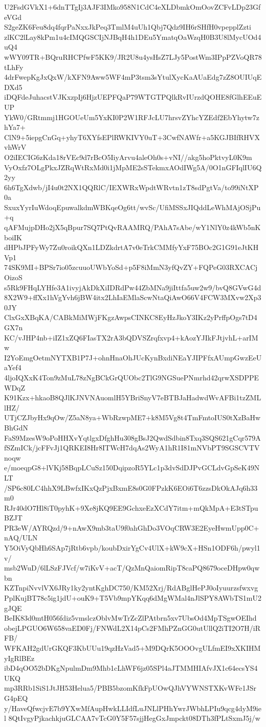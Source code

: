 U2FsdGVkX1+6dnTTgIj3AJF3IMko958N1CdC4eXLDbmkOmOovZCFvLDp23GfeVGd
S2geZK6Feu8dq4fqrPaNxxJkPeq3TmlM4uUh1Qbj7Qdz9IH6rSHfH0vpepplZzti
zlKC2lLay8kPm1u4cIMQGSCIjNJBqH4h1DEu5YmatqOaWzqH0B3U8lMycUOd4uQ4
wWY09TR+BQruRHCPfwF5KK9/JR2U8u4ysHsZ7LJy5PostWm3IPpPZVoQR78tLhFy
4drFwepKgJxQxW/kXFN9Aww5WF4mP3tsm3sYtulXycKaAUaEdg7zZ8OUIUqEDXd5
iDQFdeJuhacstVJKxzpIj6HjzUEPFQaP79WTGTPQlkRvIUrzdQOHE8fGlhEEuEUP
YkW0/GRtmmj1HGOUeUm5YxKI0P2W1RFJcLU7hrsvZYhcYZEdf2EbYhytw7zhYa7+
ClN9+5iepgCnGq+yhyT6XYfsEPlRWKIVY0uT+3CwfNAWfr+a5KGJBIfRHVXvhWrV
O2iIECIG6zKda18rVEc9d7rBcO5IiyArvu4aleOh0s+vNI//akg5hoPktvyL0K9m
VyOxfz7OLgPkxJZRqWtRxMd0i1jMpME2sSTekmxAOdIWg5A/0O1nGFIqlIU6Q2yy
6h6TgXdwb/jI4u0t2NX1QQRlC/IEXWRxWpdtWRvtn1zT8sdPgtVa/to99iNtXP0a
SxuxYyrIuWdoqEpuwalkdmWBKqeOg6tt/wvSc/UfiMSSxJIQddLeWhMAjOSjPu+q
qAFMujpDHo2jX5qBpur7SQ7PtQvRAAMRQ/PAhA7sAbe/wY1NlY0z4kWb5nKboiIK
dHPbJPFyWy7Zu0roikQXn1LDZkdrtA7v0eTrkCMMfyYxF75BOc2G1G91eJtKHVp1
74SK9MI+BPSr7io05zcuuoUWbYoSd+p5F8iMmN3yfQvZY+FQPeG03RXCACjOizoS
s5Rk9FHqLYHfe3A1ivyjAkDkXiIDRdPw44ZbMNa9jiIttfa5uw2w9/bvQ8GVwG4d
8X2W9+ffXx1hVgYvh6jBW4itx2LhIaEMlaScwNtaQiAwO66V4FCW3MXvw2Xp30JY
ClxGxXBqKA/CABkMiMWjFKgzAwpsCINKC8EyHzJkoY3IKz2yPrffpOgs7tD4GX7n
KC/vJHP4nb+iIZ1xZQ6FIasTX2rA3bQDVSZrqfxvp4+kAozYJIkFJtjvhL+arIMw
I2YoEmgOetmNYTXB1P7J+ohnHnaOhJUcKynBxdiNEaYJIPFfxAUmpGwzEeUaYef4
4ljoIQXxK4Ton9zMuL78zNgBCkGrQUObc2TlG9NGSuePNmrhd42qrwXSDPPEWDqZ
K91Kzx+hkaoB8QJlKJNVNAuomlH5YBriSnyV7eBTBJaHadwdWvAFBi1tzZMLlHZ/
UTjCZJbyHx9qOw/Z5aN8ya+WbRzwpME7+k8M5Vg8t4TmFmtoIUS0tXzBaHwBhGdN
FaS9MzesW9oPoHHXvYqtlgxDfghHu308gBsJ2QwdSdbin8Txq3SQS621gCqr579A
fSZmICk/jcFFvJj1QRKEI8Hr8ITWcH7dqAs2WyA1hR1I81mNVbPT9SGSCVTVnoqw
e/moeqpG8+lVKj58BqpLCuSz150DqipzoR5YLc1p3dvSdDJPvGCLdvGpSeK49NLT
/SP6c80LC4hhX9LBwfxIKxQzPjxBxmE8s0G0FPzkK6EOi6T6zzsDkOkAJq6h33m0
RJr40dO7Hl8iT0pyhK+9Xe8jKQ9EE9GchxeEzXCdY7itm+mQkMpA+E3tSTpuBZJT
PR3eW/AYRQzd/9+nAwX9mb3taU9f0ahGhDo3VOqCRW3E2EyeHwmUpp0C+nAQ/ULN
Y5OiVyQbHh6SAp7jRtb6vpb/koubDxirYgCv4UlX+kW9cX+HSn1ODF6h/pwyl1v/
msb2WuD/6lLSzFJVcf/w7iKvV+acT/QzMnQaiomRipT8caPQ8679oceDHpw0qwbn
KZTnpiNvvlVX6JRy1ky2yntKghDC750/KM52Xrj/RdABglHePJ0oIyuurzsfwxvg
PplKujBT78c5ig1jdU+ouK9+T5Vb9mpYKqq6dMgWMal4nJlSPY8AWbTS1mU2gJQE
BeIK83d0mtH056fdiz5vmslczOblvMwTrZcZlPAtbrn5xv7UbsOd4MpTSgwOEIhd
obejLPGUO6W658vaED0Fj/FNWdL2X14pCs2FMhPZnGG0utUllQ2iTI2O7H/iRFB/
WFKAH2gdUrGKQF3KbUUu19qzHzVad5+M9DQrK5OOOvgULfmEI9xXKIHMyIgRlBEz
ibD4qOO52bDKgNpulmDm9Mhb1cLhWF6jz05SPl4aJTMMHIAfvJX1c64ecsYS4UKQ
mp3RRb1SiS1JtJH53Helua5/PBB5bzomKfkFpUOwQJhVYWNSTXKvWFe1JSrG4pEQ
y/HaveQfwcjvE7b9YXwMfAupHwkLLIdfLuJNLlPHhYwrJWbhLPIu9qcg4dyM9iel
8QtIvgyPjkachkjuGLCAA7vTcG0Y5F57sjjHegGxJmpckt08DTh3fPLtSxmJ5j/w
